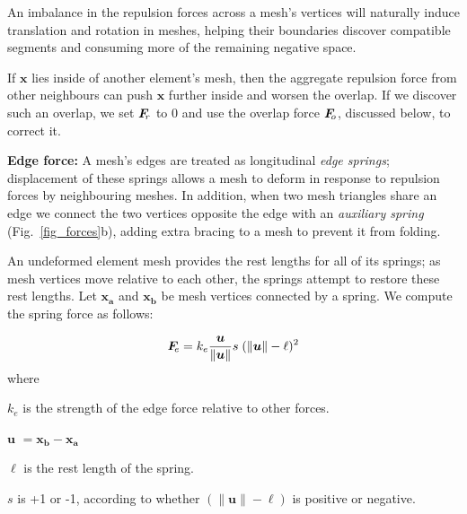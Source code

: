 An imbalance in the repulsion forces across a mesh's vertices will
naturally induce translation and rotation in meshes, helping their
boundaries discover compatible segments and consuming more of the
remaining negative space.

If $\bm{x}$ lies inside of another element's mesh, then the aggregate repulsion
force from other neighbours can push $\bm{x}$ further inside and
worsen the overlap.  If we discover such an overlap, we set
$\simforce{r}$ to $0$ and use the overlap force $\simforce{o}$, discussed below, to
correct it.

\medskip
\textbf{Edge force:} 
A mesh's edges are treated as longitudinal \textit{edge springs};
displacement
of these springs allows a mesh to deform in response to repulsion forces
by neighbouring meshes.
In addition, when two mesh triangles share an edge we connect the two vertices
opposite the edge with an \textit{auxiliary spring} (Fig.~\ref{fig_forces}b), 
adding extra bracing to a mesh to prevent it from folding.

An undeformed element mesh provides the rest lengths for all of
its springs; as mesh vertices move relative to each other, the springs
attempt to restore these rest lengths.  Let $\bm{x_{a}}$ and $\bm{x_{b}}$ be
mesh vertices connected by a spring.  We compute the spring force as follows:

\begin{equation}
\simforce{e} =  k_{e} \frac{\bm{u}}{\| \bm{u} \|} s \; ( \| \bm{u} \| - \ell)^2
\end{equation}
where
\begin{packeddescriptions}
	\item[$k_e$] is the strength of the edge force relative to other forces.
	\item[$\bm{u}$] $= \bm{x_{b}} - \bm{x_{a}}$
	\item[$\ell$] is the rest length of the spring.
	\item[$s$] is +1 or -1, according to whether $(\| \bm{u} \| - \ell)$ 
		is positive or negative.
\end{packeddescriptions}

